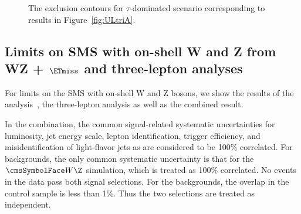 \begin{figure}[!p]
\begin{center}
\caption{The exclusion contours for $\tau$-dominated scenario corresponding to results in Figure~\ref{fig:ULtriA}. 
}
\label{fig:ULtriC}
\end{center}
\end{figure}


\subsection{Limits on SMS with on-shell W and Z from WZ + $\ETmiss$ and three-lepton analyses}
For limits on the SMS with on-shell W and Z bosons, we 
show the results of the \wzmet analysis~\cite{AN-2012:254}, the three-lepton analysis as well as the combined result.

In the combination, the common signal-related systematic uncertainties
for luminosity, jet energy scale, lepton identification, trigger efficiency, and
misidentification of light-flavor jets as \bjetsnohyphen are 
considered to be 100\% correlated. For backgrounds, the only common systematic uncertainty
is that for the $\W\Z$ simulation, which is treated as 100\% correlated.  No
events in the data pass both signal selections.  For the backgrounds,
the overlap in the control sample is less than 1\%.  Thus the two
selections are treated as independent.

